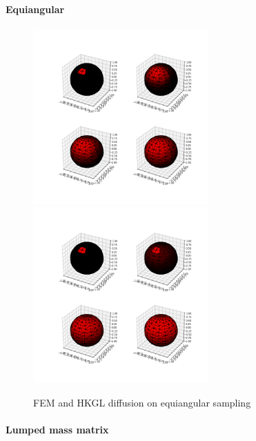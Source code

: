 \paragraph{Equiangular}
\begin{figure}[h]
	\label{fig:FEM and graph diffusion on equiangular sampling}
	\centering
	\includegraphics[width=0.6\textwidth]{../codes/03.FEM_laplacian/equiangular/normal/17_diffusion_img/FEM_diffusion.png}
	\includegraphics[width=0.6\textwidth]{../codes/03.FEM_laplacian/equiangular/normal/17_diffusion_img/GRAPH_diffusion.png}
	\caption{FEM and HKGL diffusion on equiangular sampling}
\end{figure}
\paragraph{Lumped mass matrix}


